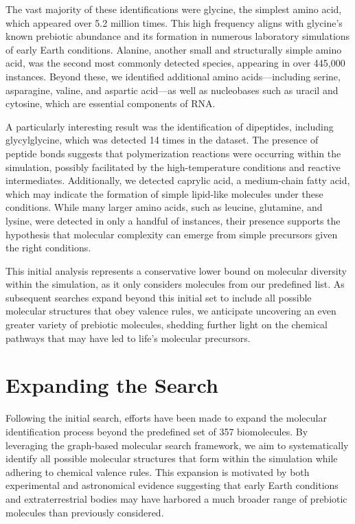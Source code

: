 The vast majority of these identifications were glycine, the simplest amino acid, which appeared over 5.2 million times. This high frequency aligns with glycine’s known prebiotic abundance and its formation in numerous laboratory simulations of early Earth conditions. Alanine, another small and structurally simple amino acid, was the second most commonly detected species, appearing in over 445,000 instances. Beyond these, we identified additional amino acids—including serine, asparagine, valine, and aspartic acid—as well as nucleobases such as uracil and cytosine, which are essential components of RNA.

A particularly interesting result was the identification of dipeptides, including glycylglycine, which was detected 14 times in the dataset. The presence of peptide bonds suggests that polymerization reactions were occurring within the simulation, possibly facilitated by the high-temperature conditions and reactive intermediates. Additionally, we detected caprylic acid, a medium-chain fatty acid, which may indicate the formation of simple lipid-like molecules under these conditions. While many larger amino acids, such as leucine, glutamine, and lysine, were detected in only a handful of instances, their presence supports the hypothesis that molecular complexity can emerge from simple precursors given the right conditions.

This initial analysis represents a conservative lower bound on molecular diversity within the simulation, as it only considers molecules from our predefined list. As subsequent searches expand beyond this initial set to include all possible molecular structures that obey valence rules, we anticipate uncovering an even greater variety of prebiotic molecules, shedding further light on the chemical pathways that may have led to life’s molecular precursors.

\section{Expanding the Search}
\label{sec:expanding_the_search}

Following the initial search, efforts have been made to expand the molecular identification process beyond the predefined set of 357 biomolecules. By leveraging the graph-based molecular search framework, we aim to systematically identify all possible molecular structures that form within the simulation while adhering to chemical valence rules. This expansion is motivated by both experimental and astronomical evidence suggesting that early Earth conditions and extraterrestrial bodies may have harbored a much broader range of prebiotic molecules than previously considered.

